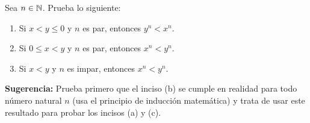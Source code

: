 \documentclass[12pt,a4paper]{article}
\begin{document}
    \begin{problema}
        Sea $n\in\mathbb{N}$. Prueba lo siguiente:
        \begin{enumerate}
            \item[(a)] Si $x<y\leq0$ y $n$ es par, entonces $y^{n}<x^{n}$.
            \item[(b)] Si $0\leq x<y$ y $n$ es par, entonces $x^{n}<y^{n}$.
            \item[(c)] Si $x<y$ y $n$ es impar, entonces $x^{n}<y^{n}$.
        \end{enumerate}
        \textbf{Sugerencia:} Prueba primero que el inciso (b) se cumple en realidad para todo número natural $n$ (usa el principio de inducción matemática) y trata de usar este resultado para probar los incisos (a) y (c).
    \end{problema}
\end{document}
